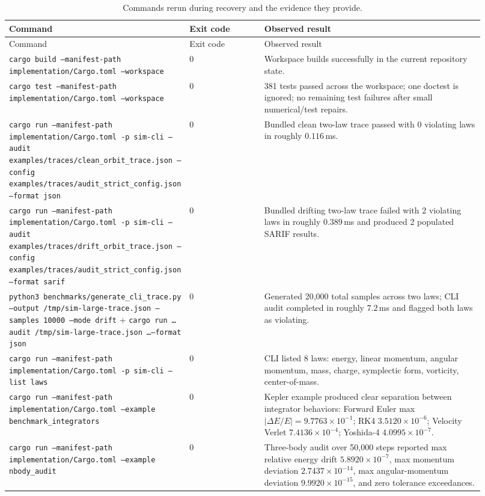 \documentclass[11pt]{article}
\begin{document}
\begin{longtable}{p{0.29\linewidth}p{0.16\linewidth}p{0.47\linewidth}}
\caption{Commands rerun during recovery and the evidence they provide.}\label{tab:reruns}\\
\toprule
Command & Exit code & Observed result \\
\midrule
\endfirsthead
\toprule
Command & Exit code & Observed result \\
\midrule
\endhead
\texttt{cargo build --manifest-path implementation/Cargo.toml --workspace} & 0 & Workspace builds successfully in the current repository state. \\
\texttt{cargo test --manifest-path implementation/Cargo.toml --workspace} & 0 & 381 tests passed across the workspace; one doctest is ignored; no remaining test failures after small numerical/test repairs. \\
\texttt{cargo run --manifest-path implementation/Cargo.toml -p sim-cli -- audit examples/traces/clean\_orbit\_trace.json --config examples/traces/audit\_strict\_config.json --format json} & 0 & Bundled clean two-law trace passed with 0 violating laws in roughly $0.116$\,ms. \\
\texttt{cargo run --manifest-path implementation/Cargo.toml -p sim-cli -- audit examples/traces/drift\_orbit\_trace.json --config examples/traces/audit\_strict\_config.json --format sarif} & 0 & Bundled drifting two-law trace failed with 2 violating laws in roughly $0.389$\,ms and produced 2 populated SARIF results. \\
\texttt{python3 benchmarks/generate\_cli\_trace.py --output /tmp/sim-large-trace.json --samples 10000 --mode drift} + \texttt{cargo run \dots audit /tmp/sim-large-trace.json \dots --format json} & 0 & Generated 20{,}000 total samples across two laws; CLI audit completed in roughly $7.2$\,ms and flagged both laws as violating. \\
\texttt{cargo run --manifest-path implementation/Cargo.toml -p sim-cli -- list laws} & 0 & CLI listed 8 laws: energy, linear momentum, angular momentum, mass, charge, symplectic form, vorticity, center-of-mass. \\
\texttt{cargo run --manifest-path implementation/Cargo.toml --example benchmark\_integrators} & 0 & Kepler example produced clear separation between integrator behaviors: Forward Euler max $|\Delta E/E|=9.7763\times10^{-1}$; RK4 $3.5120\times10^{-6}$; Velocity Verlet $7.4136\times10^{-4}$; Yoshida-4 $4.0995\times10^{-7}$. \\
\texttt{cargo run --manifest-path implementation/Cargo.toml --example nbody\_audit} & 0 & Three-body audit over 50{,}000 steps reported max relative energy drift $5.8920\times10^{-7}$, max momentum deviation $2.7437\times10^{-14}$, max angular-momentum deviation $9.9920\times10^{-15}$, and zero tolerance exceedances. \\

\end{longtable}
\end{document}
